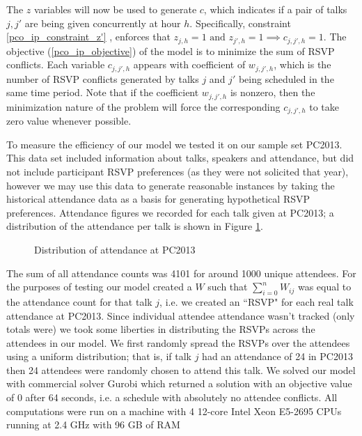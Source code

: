\documentclass{svjour3}                     %
\begin{document}
The $z$ variables will now be used to generate $c$, which indicates if a pair of talks $j,j'$ are being given concurrently at hour $h$. 
Specifically, constraint \eqref{pco_ip_constraint_z'} , enforces that $z_{j,h} = 1 \text{ and } z_{j',h} = 1 \implies c_{j,j',h}=1$. 
The objective (\ref{pco_ip_objective}) of the model is to minimize the sum of RSVP conflicts.
Each variable $c_{j,j',h}$ appears with coefficient of $w_{j,j',h}$, which is the number of RSVP conflicts generated by talks $j$ and $j'$ being scheduled in the same time period.
Note that if the coefficient $w_{j,j',h}$ is nonzero, then the minimization nature of the problem will force the corresponding $c_{j,j',h}$ to take zero value whenever possible.

To measure the efficiency of our model we tested it on our sample set PC2013. 
This data set included information about talks, speakers and attendance, but did not include participant RSVP preferences (as they were not solicited that year), however we may use this data to generate reasonable instances by taking the historical attendance data as a basis for generating hypothetical RSVP preferences.
Attendance figures we recorded for each talk given at PC2013; a distribution of the attendance per talk is shown in Figure \ref{2013_attendance_distribution}.
\begin{figure}[h!]
	\caption{Distribution of attendance at PC2013}
	\centering
	
	\label{2013_attendance_distribution}
\end{figure}
The sum of all attendance counts was 4101 \cite{pc2013_attendance} for around 1000 unique attendees. 
For the purposes of testing our model created a $W$ such that $\sum\limits_{i=0}^{n} W_{ij}$ was equal to the attendance count for that talk $j$, i.e. we created an ``RSVP" for each real talk attendance at PC2013. 
Since individual attendee attendance wasn't tracked (only totals were) we took some liberties in distributing the RSVPs across the attendees in our model. 
We first randomly spread the RSVPs over the attendees using a uniform distribution; that is, if talk $j$ had an attendance of 24 in PC2013 then 24 attendees were randomly chosen to attend this talk. 
We solved our model with commercial solver Gurobi which returned a solution with an objective value of 0 after 64 seconds, i.e. a schedule with absolutely no attendee conflicts.
All computations were run on a machine with 4 12-core Intel Xeon E5-2695 CPUs running at 2.4 GHz with 96 GB of RAM
\end{document}
